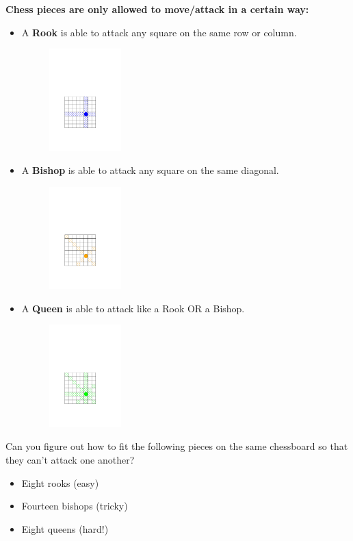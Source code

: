 
\newcommand{\activityname}{
  Check Mates
}
\newcommand{\subtitle}{
  Graph Theory for Grandmasters
}


\noindent\textbf{Chess pieces are only allowed to move/attack in a certain way:}

\begin{itemize}
\item A \textbf{Rook} is able to attack any square on the same row or column.
\begin{figure}[h]
\begin{center}
\includegraphics[width=1.1in]{RookAttack.pdf}
\end{center}
\end{figure}
\item A \textbf{Bishop} is able to attack any square on the same diagonal.
\begin{figure}[h]
\begin{center}
\includegraphics[width=1.1in]{BishopAttack.pdf}
\end{center}
\end{figure}
\item A \textbf{Queen} is able to attack like a Rook OR a Bishop.
\begin{figure}[h]
\begin{center}
\includegraphics[width=1.1in]{QueenAttack.pdf}
\end{center}
\end{figure}
\end{itemize}

\noindent Can you figure out how to fit the following pieces on the same chessboard so that they can't attack one another?
  \begin{itemize}
    \item Eight rooks (easy)
    \item Fourteen bishops (tricky)
    \item Eight queens (hard!)
  \end{itemize}

